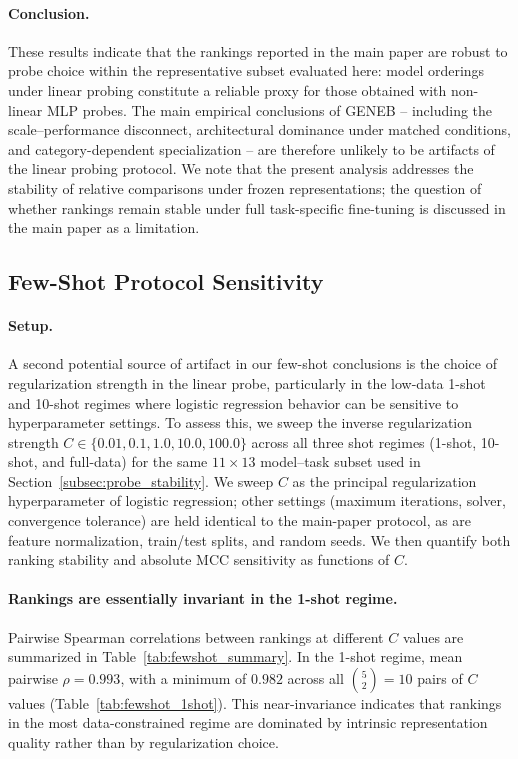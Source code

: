 \documentclass{llmxive}
\begin{document}
\paragraph{Conclusion.}
These results indicate that the rankings reported in the main paper are
robust to probe choice within the representative subset evaluated here:
model orderings under linear probing constitute a reliable proxy for
those obtained with non-linear MLP probes. The main empirical
conclusions of GENEB -- including the scale--performance disconnect,
architectural dominance under matched conditions, and category-dependent
specialization -- are therefore unlikely to be artifacts of the linear
probing protocol. We note that the present analysis addresses the
stability of relative comparisons under frozen representations; the
question of whether rankings remain stable under full task-specific
fine-tuning is discussed in the main paper as a limitation.

\subsection{Few-Shot Protocol Sensitivity}
\label{subsec:fewshot_sensitivity}

\paragraph{Setup.}
A second potential source of artifact in our few-shot conclusions is the
choice of regularization strength in the linear probe, particularly in
the low-data 1-shot and 10-shot regimes where logistic regression
behavior can be sensitive to hyperparameter settings. To assess this, we
sweep the inverse regularization strength
$C \in \{0.01, 0.1, 1.0, 10.0, 100.0\}$
across all three shot regimes (1-shot, 10-shot, and full-data) for the
same $11 \times 13$ model--task subset used in
Section~\ref{subsec:probe_stability}. We sweep $C$ as the principal
regularization hyperparameter of logistic regression; other settings
(maximum iterations, solver, convergence tolerance) are held identical
to the main-paper protocol, as are feature normalization, train/test
splits, and random seeds. We then quantify both ranking stability and
absolute MCC sensitivity as functions of $C$.

\paragraph{Rankings are essentially invariant in the 1-shot regime.}
Pairwise Spearman correlations between rankings at different $C$ values
are summarized in Table~\ref{tab:fewshot_summary}. In the 1-shot regime,
mean pairwise $\rho = 0.993$, with a minimum of $0.982$ across all
$\binom{5}{2}=10$ pairs of $C$ values
(Table~\ref{tab:fewshot_1shot}). This near-invariance indicates that
rankings in the most data-constrained regime are dominated by intrinsic
representation quality rather than by regularization choice.
\end{document}

